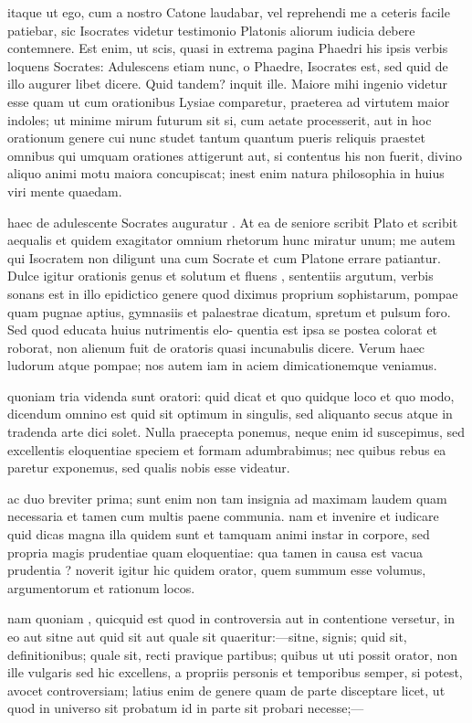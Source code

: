  itaque ut ego, cum a nostro Catone laudabar, vel reprehendi me a ceteris facile patiebar, sic Isocrates videtur testimonio Platonis aliorum iudicia debere contemnere. Est enim, ut scis, quasi in extrema pagina Phaedri his ipsis verbis loquens Socrates: Adulescens etiam nunc, o Phaedre, Isocrates est, sed quid de illo augurer libet dicere. Quid tandem? inquit ille. Maiore mihi ingenio videtur esse quam ut cum orationibus Lysiae comparetur, praeterea ad virtutem maior indoles; ut minime mirum futurum sit si, cum aetate processerit, aut in hoc orationum genere cui nunc studet tantum quantum pueris reliquis praestet omnibus qui umquam orationes attigerunt aut, si contentus his non fuerit, divino aliquo animi motu maiora concupiscat; inest enim natura philosophia in huius viri mente quaedam.

 haec de adulescente Socrates auguratur . At ea de seniore scribit Plato et scribit aequalis et quidem exagitator omnium rhetorum hunc miratur unum; me autem qui Isocratem non diligunt una cum Socrate et cum Platone errare patiantur. Dulce igitur orationis genus et solutum et fluens , sententiis argutum, verbis sonans est in illo epidictico genere quod diximus proprium sophistarum, pompae quam pugnae aptius, gymnasiis et palaestrae dicatum, spretum et pulsum foro. Sed quod educata huius nutrimentis elo- quentia est ipsa se postea colorat et roborat, non alienum fuit de oratoris quasi incunabulis dicere. Verum haec ludorum atque pompae; nos autem iam in aciem dimicationemque veniamus.

 quoniam tria videnda sunt oratori: quid dicat et quo quidque loco et quo modo, dicendum omnino est quid sit optimum in singulis, sed aliquanto secus atque in tradenda arte dici solet. Nulla praecepta ponemus, neque enim id suscepimus, sed excellentis eloquentiae speciem et formam adumbrabimus; nec quibus rebus ea paretur exponemus, sed qualis nobis esse videatur.

 ac duo breviter prima; sunt enim non tam insignia ad maximam laudem quam necessaria et tamen cum multis paene communia. nam et invenire et iudicare quid dicas magna illa quidem sunt et tamquam animi instar in corpore, sed propria magis prudentiae quam eloquentiae: qua tamen in causa est vacua prudentia ? noverit igitur hic quidem orator, quem summum esse volumus, argumentorum et rationum locos.

 nam quoniam , quicquid est quod in controversia aut in contentione versetur, in eo aut sitne aut quid sit aut quale sit quaeritur:—sitne, signis; quid sit, definitionibus; quale sit, recti pravique partibus; quibus ut uti possit orator, non ille vulgaris sed hic excellens, a propriis personis et temporibus semper, si potest, avocet controversiam; latius enim de genere quam de parte disceptare licet, ut quod in universo sit probatum id in parte sit probari necesse;—

